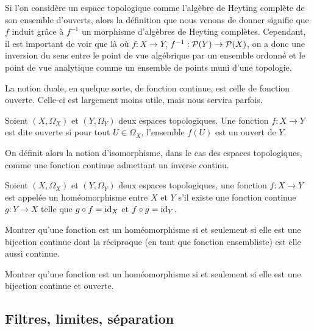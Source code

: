 \begin{remark}
  Si l'on considère un espace topologique comme l'algèbre de Heyting complète de
  son ensemble d'ouverts, alors la définition que nous venons de donner signifie
  que $f$ induit grâce à $f^{-1}$ un morphisme d'algèbres de Heyting complètes.
  Cependant, il est important de voir que là où $f : X \to Y$,
  $f^{-1} : \mathcal{P}(Y)\to\mathcal{P}(X)$, on a donc une inversion du sens entre
  le point de vue algébrique par un ensemble ordonné et le point de vue
  analytique comme un ensemble de points muni d'une topologie.
\end{remark}

La notion duale, en quelque sorte, de fonction continue, est celle de fonction
ouverte. Celle-ci est largement moins utile, mais nous servira parfois.

\begin{definition}
  Soient $(X,\Omega_X)$ et $(Y,\Omega_Y)$ deux espaces topologiques. Une
  fonction $f : X \to Y$ est dite ouverte si pour tout $U \in \Omega_X$,
  l'ensemble $f(U)$ est un ouvert de $Y$.
\end{definition}

On définit alors la notion d'isomorphisme, dans le cas des espaces topologiques,
comme une fonction continue admettant un inverse continu.

\begin{definition}[Homéomorphisme]
  Soient $(X,\Omega_X)$ et $(Y,\Omega_Y)$ deux espaces topologiques, une
  fonction $f : X \to Y$ est appelée un homéomorphisme entre $X$ et $Y$ s'il
  existe une fonction continue $g : Y \to X$ telle que $g\circ f = \operatorname{id}_X$ et
  $f\circ g = \operatorname{id}_Y$.
\end{definition}

\begin{exercise}
  Montrer qu'une fonction est un homéomorphisme si et seulement si elle est
  une bijection continue dont la réciproque (en tant que fonction ensembliste)
  est elle aussi continue.
\end{exercise}

\begin{exercise}
  Montrer qu'une fonction est un homéomorphisme si et seulement si elle
  est une bijection continue et ouverte.
\end{exercise}

\subsection{Filtres, limites, séparation}

